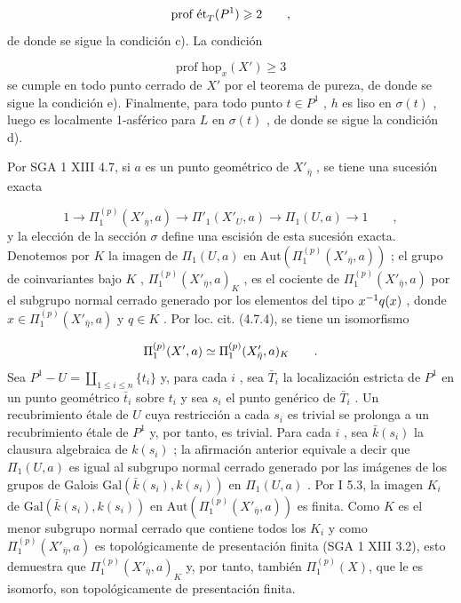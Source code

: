 \begin{equation*}
\text{prof ét}_T(\sisi{S}{P^1}) \geqslant 2 \qquad ,
\end{equation*}
de donde se sigue la condición c). La condición

\begin{equation*}
\text{prof hop}_x(X') \geqslant 3
\end{equation*}
se cumple en todo punto cerrado de $X'$ por el teorema de pureza, de donde se sigue la condición e). Finalmente, para todo punto $t \in P^1$ , $h$ es liso en $\sigma(t)$ , luego es localmente 1-asférico para $L$ en $\sigma(t)$ , de donde se sigue la condición d).

Por SGA 1 XIII 4.7, si $a$ es un punto geométrico de $X'_{\bar{\eta}}$ , se tiene una sucesión exacta

\begin{equation*}
1 \longrightarrow \Pi_1^{(p)}(X'_{\bar{\eta}},a) \longrightarrow \Pi'_1(X'_U,a) \longrightarrow \Pi_1(U,a) \longrightarrow 1 \qquad ,
\end{equation*}
y la elección de la sección $\sigma$ define una escisión de esta sucesión exacta. Denotemos por $K$ la imagen de $\Pi_1(U,a)$ en $\mathrm{Aut}(\Pi_1^{(p)}(X'_{\bar{\eta}},a))$ ; el grupo de coinvariantes bajo $K$ , $\Pi_1^{(p)}(X'_{\bar{\eta}},a)_K$ , es el cociente de $\Pi_1^{(p)}(X'_{\bar{\eta}},a)$ por el subgrupo normal cerrado generado por los elementos del tipo $\sisi{x^{-1}qx}{x^{-1}q(x)}$ , donde $x \in \Pi_1^{(p)}(X'_{\bar{\eta}},a)$  y $q \in K$ . Por loc. cit. (4.7.4), se tiene un isomorfismo

\begin{equation*}
\Pi_1^{(p)}(X',a) \simeq \sisi{\Pi_1^{(p)}(X'_{\bar{\eta}},a)}{\Pi_1^{(p)}(X'_{\bar{\eta}},a)_K} \qquad .
\end{equation*}
Sea $P^1 - U = \coprod_{1\leqslant i\leqslant n} \{t_i\}$ y, para cada $i$ , sea $\bar{T}_i$ la localización estricta de $P^1$ en un punto geométrico $\bar{t}_i$ sobre $t_i$ y sea $s_i$ el punto genérico de $\bar{T}_i$ . Un recubrimiento étale de $U$ cuya restricción a cada $s_i$ es trivial se prolonga a un recubrimiento étale de $P^1$ y, por tanto, es trivial. Para cada $i$ , sea $\bar{k}(s_i)$ la clausura algebraica de $k(s_i)$ ; la afirmación anterior equivale a decir que $\Pi_1(U,a)$ es igual al subgrupo normal cerrado generado por las imágenes de los grupos de Galois $\mathrm{Gal}(\bar{k}(s_i),k(s_i))$ en $\Pi_1(U,a)$ . Por I 5.3, la imagen $K_i$ de $\mathrm{Gal}(\bar{k}(s_i),k(s_i))$ en $\mathrm{Aut}(\Pi_1^{(p)}(X'_{\bar{\eta}},a))$ es finita. Como $K$ es el menor subgrupo normal cerrado que contiene todos los $K_i$ y como $\Pi_1^{(p)}(X'_{\bar{\eta}},a)$ es topológicamente de presentación finita (SGA 1 XIII 3.2), esto demuestra que $\Pi_1^{(p)}(X'_{\bar{\eta}},a)_K$ y, por tanto, también $\Pi_1^{(p)}(X)$, que le es isomorfo, son topológicamente de presentación finita.


